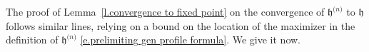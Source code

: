 \documentclass[oneside,final,11pt]{amsart}
\theoremstyle{definition}
\newcommand{\fh}{\mathfrak{h}}
\newcommand{\h}{\fh^{{\scriptscriptstyle(}n{\scriptscriptstyle)}}}
\newcommand{\1}[1]{\mathbf{1}_{#1}}
\newcommand{\hlim}{\mathfrak{h}}
\numberwithin{equation}{section}
\begin{document}


The proof of Lemma~\ref{l.convergence to fixed point} on the convergence of $\h$ to $\hlim$ follows similar lines, relying on a bound on the location of the maximizer in the definition of $\h$ \eqref{e.prelimiting gen profile formula}. We give it now.
\end{document}
